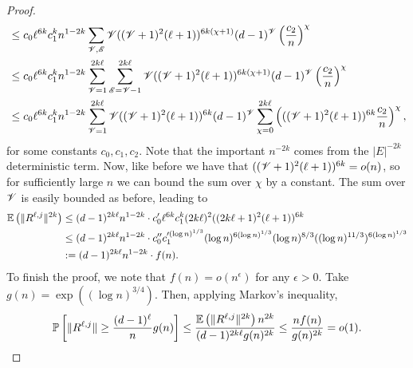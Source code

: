 \begin{proof}
\begin{align*}
    &\leq
    c_0 
    \ell^{6k} 
    c_1^k 
    n^{1 - 2k}
    \sum_{\mathscr{V}, \mathscr{E}}
    \mathscr{V}
    ( (\mathscr{V} + 1)^2 (\ell + 1) )^{6k(\chi + 1)}
    (d - 1)^{\mathscr{V}}
    \left(
    \frac{c_2}{n}
    \right)^{\chi} \\
    &\leq
    c_0 
    \ell^{6k} 
    c_1^k 
    n^{1 - 2k}
    \sum_{\mathscr{V} = 1}^{2k\ell}
    \sum_{\mathscr{E} = \mathscr{V} - 1}^{2k\ell}
    \mathscr{V}
    ( (\mathscr{V} + 1)^2 (\ell + 1) )^{6k(\chi + 1)}
    (d - 1)^{\mathscr{V}}
    \left(
    \frac{c_2}{n}
    \right)^{\chi} \\
    &\leq
    c_0 
    \ell^{6k} 
    c_1^k 
    n^{1 - 2k}
    \sum_{\mathscr{V} = 1}^{2k\ell}
    \mathscr{V}
    ( (\mathscr{V} + 1)^2 (\ell + 1) )^{6k}
    (d - 1)^{\mathscr{V}}
    \sum_{\chi = 0}^{2k\ell}
    \left(
    ( (\mathscr{V} + 1)^2 (\ell + 1) )^{6k}
    \frac{c_2}{n}
    \right)^{\chi}
    ,
\end{align*}
for some constants $c_0, c_1, c_2$.
Note that the important $n^{-2k}$ comes from
the $|E|^{-2k}$ deterministic term.
Now, like before we have that $( (\mathscr{V} + 1)^2 (\ell + 1) )^{6k} = o(n)$,
so for sufficiently large $n$ we can bound the sum over $\chi$
by a constant.
The sum over $\mathscr{V}$ is easily bounded as before, leading to
\begin{align*}
    \mathbb{E}\left(\|R^{\ell,j}\|^{2k}\right)
    &\leq 
    (d-1)^{2k\ell}
    n^{1-2k}
    \cdot
    c_0'
    \ell^{6k} 
    c_1^k 
    (2k\ell)^2
    ((2k\ell + 1)^2 (\ell + 1))^{6k}
    \\
    &\leq
    (d-1)^{2k\ell}
    n^{1-2k}
    \cdot
    c_0''
    c_1'^{(\log n)^{1/3}}
    (\log n)^{6(\log n)^{1/3}}
    (\log n)^{8/3}
    ((\log n)^{11/3})^{6(\log n)^{1/3}} \\
    &:= 
    (d-1)^{2k\ell}
    n^{1-2k}
    \cdot 
    f(n).
\end{align*}
To finish the proof, we note that $f(n) = o(n^\epsilon)$ 
for any $\epsilon > 0$.
Take $g(n) = \exp((\log n)^{3/4})$.
Then, applying Markov's inequality,
\begin{equation}
    \mathbb{P} 
    \left[ 
    \| R^{\ell,j} \| 
    \geq \frac{(d - 1)^{\ell} }{n} g(n)
    \right]
    \leq
    \frac{\mathbb{E} \left( \| R^{\ell,j} \|^{2k} \right) n^{2k}}
    { (d-1)^{2k\ell} g(n)^{2k} }
    \leq
    \frac{n f(n)}{g(n)^{2k}} = o(1).
\end{equation}


\end{proof}

